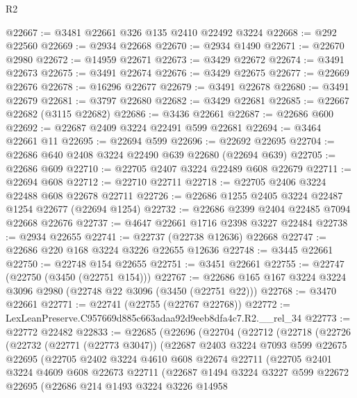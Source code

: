 \begin{lexlean}{R2}
\begin{coremodule}
@22667 := @3481 @22661 @326 @135 @2410 @22492 @3224
@22668 := @292 @22560
@22669 := @2934 @22668
@22670 := @2934 @1490
@22671 := @22670 @2980
@22672 := @14959 @22671
@22673 := @3429 @22672
@22674 := @3491 @22673
@22675 := @3491 @22674
@22676 := @3429 @22675
@22677 := @22669 @22676
@22678 := @16296 @22677
@22679 := @3491 @22678
@22680 := @3491 @22679
@22681 := @3797 @22680
@22682 := @3429 @22681
@22685 := @22667 @22682 (@3115 @22682)
@22686 := @3436 @22661
@22687 := @22686 @600
@22692 := @22687 @2409 @3224 @22491 @599 @22681
@22694 := @3464 @22661 @11
@22695 := @22694 @599
@22696 := @22692 @22695
@22704 := @22686 @640 @2408 @3224 @22490 @639 @22680 (@22694 @639)
@22705 := @22686 @609
@22710 := @22705 @2407 @3224 @22489 @608 @22679
@22711 := @22694 @608
@22712 := @22710 @22711
@22718 := @22705 @2406 @3224 @22488 @608 @22678 @22711
@22726 := @22686 @1255 @2405 @3224 @22487 @1254 @22677 (@22694 @1254)
@22732 := @22686 @2399 @2404 @22485 @7094 @22668 @22676
@22737 := @4647 @22661 @1716 @2398 @3227 @22484
@22738 := @2934 @22655
@22741 := @22737 (@22738 @12636) @22668
@22747 := @22686 @220 @168 @3224 @3226 @22655 @12636
@22748 := @3445 @22661
@22750 := @22748 @154 @22655
@22751 := @3451 @22661
@22755 := @22747 (@22750 (@3450 (@22751 @154)))
@22767 := @22686 @165 @167 @3224 @3224 @3096 @2980 (@22748 @22 @3096 (@3450 (@22751 @22)))
@22768 := @3470 @22661
@22771 := @22741 (@22755 (@22767 @22768))
@22772 := LexLeanPreserve.C957669d885c663adaa92d9eeb8dfa4c7.R2.__rel_34
@22773 := @22772 @22482
@22833 := @22685
    (@22696
      (@22704
        (@22712
          (@22718
            (@22726
              (@22732
                (@22771 (@22773 @3047))
                (@22687
                  @2403
                  @3224
                  @7093
                  @599
                  @22675
                  @22695
                  (@22705
                    @2402
                    @3224
                    @4610
                    @608
                    @22674
                    @22711
                    (@22705
                      @2401
                      @3224
                      @4609
                      @608
                      @22673
                      @22711
                      (@22687
                        @1494
                        @3224
                        @3227
                        @599
                        @22672
                        @22695
                        (@22686
                          @214
                          @1493
                          @3224
                          @3226
                          @14958

\end{coremodule}
\end{lexlean}
